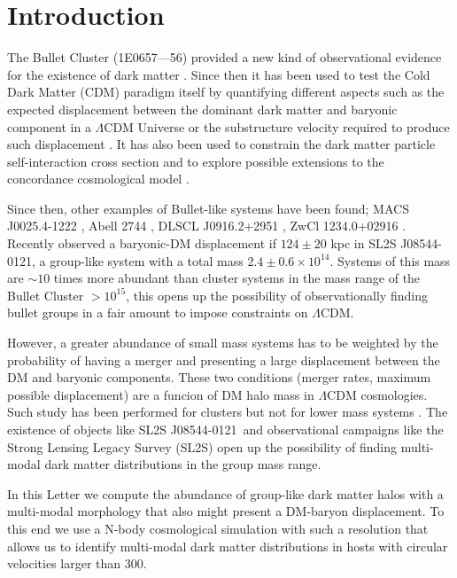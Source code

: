 \documentclass{emulateapj}
\newcommand{\hMsun}{{\ifmmode{h^{-1}{\rm {M_{\odot}}}}\else{$h^{-1}{\rm{M_{\odot}}}$}\fi}}
\newcommand{\Msun}{{\ifmmode{{\rm {M_{\odot}}}}\else{${\rm{M_{\odot}}}$}\fi}}
\newcommand{\kms}{{\ifmmode{{\mathrm{\,km\ s}^{-1}}}\else{\,km~s$^{-1}$}\fi}}
\newcommand{\bulla}{1E0657---56}
\newcommand{\bullg}{SL2S J08544-0121}
\begin{document}


\section{Introduction}


The Bullet Cluster (\bulla) provided a new kind of observational
evidence for the existence of dark matter
\citep{Markevitch2004,Clowe2006}. Since then it has been used to test the Cold
Dark Matter (CDM) paradigm itself by quantifying different aspects
such as the expected displacement between the dominant dark matter and
baryonic component in a $\Lambda$CDM Universe \citep{ForeroRomero2010}
or the substructure velocity required to produce such displacement \citep{Hayashi2006, Springel2007,
  Thompson2012}. It has also been used to constrain the dark matter
particle self-interaction cross section and to explore possible
extensions to the concordance cosmological model
\citep{Farrar2007,Lee2010,Lee2012}.     
 

Since then, other examples of Bullet-like systems have been found; 
MACS J0025.4-1222 \citep{Bradac2008}, Abell 2744 \citep{Merten2011},
DLSCL J0916.2+2951 \citep{Dawson2012}, ZwCl 1234.0+02916
\citep{Dahle2013}. Recently \citep{Gastaldello} observed a baryonic-DM
displacement if $124\pm 20$ kpc in \bullg, a group-like system with a total
mass $2.4\pm 0.6 \times 10^{14}$\Msun. Systems of this mass are
$\sim10$ times more abundant than cluster systems in the mass range of
the Bullet Cluster $>10^{15}$\hMsun, this opens up the possibility of
observationally finding bullet groups in a fair amount to impose
constraints on $\Lambda$CDM. 


However, a greater abundance of small mass systems has to be weighted
by the probability of having a merger and 
presenting a large displacement between the DM and baryonic
components. These two conditions (merger rates, maximum possible
displacement) are a funcion of DM halo mass in $\Lambda$CDM
cosmologies.  Such study has been performed for clusters but not for
lower mass systems \citep{ForeroRomero2010}. The existence of objects
like \bullg\ and observational campaigns like the Strong Lensing Legacy
Survey (SL2S) \citep{Cabanac2007,More2012} open up the possibility of finding
multi-modal dark matter distributions in the group mass range. 


In this Letter we compute the abundance of group-like dark
matter halos with a multi-modal morphology that also might present a
DM-baryon displacement. To this end we use a N-body cosmological
simulation with such a resolution that allows us to identify
multi-modal dark matter distributions in hosts with circular velocities
larger than $300$\kms.  
\end{document}
